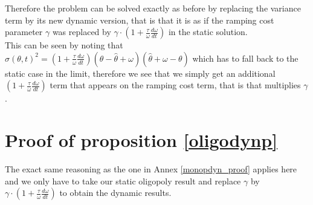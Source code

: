 \begin{subappendices}
Therefore the problem can be solved exactly as before by replacing the variance term by its new dynamic version, that is that it is as if the ramping cost parameter $\gamma$ was replaced by $\gamma \cdot \left( 1+ \frac{\tau}{\omega}\frac{d\omega}{dt}\right)$ in the static solution.\\

This can be seen by noting that $\sigma(\theta,t)^2 = \left(1+\frac{\tau}{\omega}\frac{d\omega}{dt}\right)(\theta-\hat{\theta}+\omega)(\hat{\theta}+\omega-\theta)$ which has to fall back to the static case in the limit, therefore we see that we simply get an additional $\left(1+\frac{\tau}{\omega}\frac{d\omega}{dt}\right)$ term that appears on the ramping cost term, that is that multiplies $\gamma$.

\section{Proof of proposition \ref{oligodynp}}\label{oligodyn_proof}

The exact same reasoning as the one in Annex \ref{monopdyn_proof} applies here and we only have to take our static oligopoly result and replace  $\gamma$ by $\gamma \cdot \left( 1+ \frac{\tau}{\omega}\frac{d\omega}{dt}\right)$ to obtain the dynamic results.














\end{subappendices}
